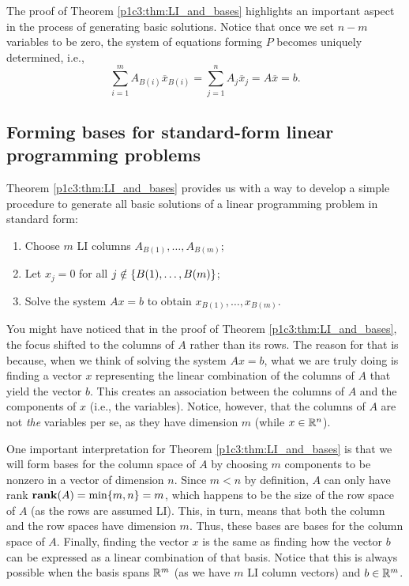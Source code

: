 The proof of Theorem \ref{p1c3:thm:LI_and_bases} highlights an important aspect in the process of generating basic solutions. Notice that once we set $n-m$ variables to be zero, the system of equations forming $P$ becomes uniquely determined, i.e., 
%
\begin{equation*}
	\sum_{i=1}^m A_{B(i)}\overline{x}_{B(i)} = \sum_{j=1}^n A_j\overline{x}_j = A\overline{x} = b.
\end{equation*}	
%


\subsection{Forming bases for standard-form linear programming problems}

Theorem \ref{p1c3:thm:LI_and_bases} provides us with a way to develop a simple procedure to generate all basic solutions of a linear programming problem in standard form:

\begin{enumerate}
	\item Choose $m$ LI columns $A_{B(1)}, \dots, A_{B(m)}$;
	\item Let $x_j = 0$ for all $j \notin \left\{ B(1), \dots, B(m) \right \}$;
	\item Solve the system $Ax = b$ to obtain $x_{B(1)}, \dots, x_{B(m)}$.
\end{enumerate}

You might have noticed that in the proof of Theorem \ref{p1c3:thm:LI_and_bases}, the focus shifted to the columns of $A$ rather than its rows. The reason for that is because, when we think of solving the system $Ax = b$, what we are truly doing is finding a vector $x$ representing the linear combination of the columns of $A$ that yield the vector $b$. This creates an association between the columns of $A$ and the components of $x$ (i.e., the variables). Notice, however, that the columns of $A$ are not \emph{the} variables per se, as they have dimension $m$ (while $x \in \mathbb{R}^n$). 

One important interpretation for Theorem \ref{p1c3:thm:LI_and_bases} is that we will form bases for the column space of $A$ by choosing $m$ components to be nonzero in a vector of dimension $n$. Since $m < n$ by definition, $A$ can only have rank $\mathop{\bf rank}(A) = \min\{m,n\} = m$, which happens to be the size of the row space of $A$ (as the rows are assumed LI). This, in turn, means that both the column and the row spaces have dimension $m$. Thus, these bases are bases for the column space of $A$. Finally, finding the vector $x$ is the same as finding how the vector $b$ can be expressed as a linear combination of that basis. Notice that this is always possible when the basis spans $\mathbb{R}^m$ (as we have $m$ LI column vectors) and $b \in \mathbb{R}^m$.

